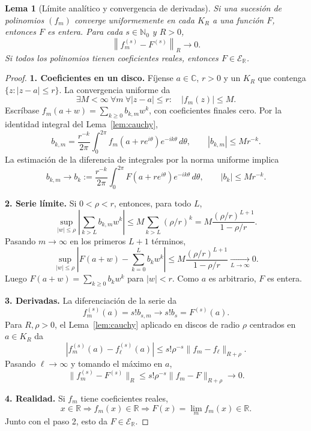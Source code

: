 \documentclass[11pt,a4paper]{article}
\numberwithin{equation}{section}
\newtheorem{lemma}[theorem]{Lema}
\theoremstyle{definition}
\theoremstyle{remark}
\newcommand{\R}{\mathbb R}
\newcommand{\C}{\mathbb C}
\newcommand{\Nn}{\mathbb N_0}
\newcommand{\ER}{\mathcal E_{\R}}
\newcommand{\norm}[1]{\left\lVert#1\right\rVert}
\newcommand{\paso}[1]{\par\smallskip\noindent\textbf{#1}\quad}
\begin{document}
\begin{lemma}[Límite analítico y convergencia de derivadas]\label{lem:analyticlimit}
Si una sucesión de polinomios $(f_m)$ converge uniformemente en cada $K_R$ a una función $F$, entonces $F$ es entera. Para cada $s\in\Nn$ y $R>0$,
\[
\norm{f_m^{(s)}-F^{(s)}}_R\longrightarrow0.
\]
Si todos los polinomios tienen coeficientes reales, entonces $F\in\ER$.
\end{lemma}
\begin{proof}
\paso{1. Coeficientes en un disco.}
Fíjense $a\in\C$, $r>0$ y un $K_R$ que contenga $\{z:|z-a|\le r\}$. La convergencia uniforme da
\[
\exists M<\infty\ \forall m\ \forall |z-a|\le r:\quad |f_m(z)|\le M.
\]
Escríbase $f_m(a+w)=\sum_{k\ge0}b_{k,m}w^k$, con coeficientes finales cero. Por la identidad integral del Lema~\ref{lem:cauchy},
\[
b_{k,m}=\frac{r^{-k}}{2\pi}\int_0^{2\pi}f_m(a+re^{i\theta})e^{-ik\theta}\,d\theta,
\qquad |b_{k,m}|\le Mr^{-k}.
\]
La estimación de la diferencia de integrales por la norma uniforme implica
\[
b_{k,m}\to b_k:=\frac{r^{-k}}{2\pi}\int_0^{2\pi}F(a+re^{i\theta})e^{-ik\theta}\,d\theta,
\qquad |b_k|\le Mr^{-k}.
\]
\paso{2. Serie límite.}
Si $0<\rho<r$, entonces, para todo $L$,
\[
\sup_{|w|\le\rho}\left|\sum_{k>L}b_{k,m}w^k\right|
\le M\sum_{k>L}(\rho/r)^k
=M\frac{(\rho/r)^{L+1}}{1-\rho/r}.
\]
Pasando $m\to\infty$ en los primeros $L+1$ términos,
\[
\sup_{|w|\le\rho}\left|F(a+w)-\sum_{k=0}^Lb_kw^k\right|
\le M\frac{(\rho/r)^{L+1}}{1-\rho/r}\xrightarrow[L\to\infty]{}0.
\]
Luego $F(a+w)=\sum_{k\ge0}b_kw^k$ para $|w|<r$. Como $a$ es arbitrario, $F$ es entera.
\paso{3. Derivadas.}
La diferenciación de la serie da
\[
f_m^{(s)}(a)=s!b_{s,m}\longrightarrow s!b_s=F^{(s)}(a).
\]
Para $R,\rho>0$, el Lema~\ref{lem:cauchy} aplicado en discos de radio $\rho$ centrados en $a\in K_R$ da
\[
|f_m^{(s)}(a)-f_\ell^{(s)}(a)|\le s!\rho^{-s}\|f_m-f_\ell\|_{R+\rho}.
\]
Pasando $\ell\to\infty$ y tomando el máximo en $a$,
\[
\|f_m^{(s)}-F^{(s)}\|_R\le s!\rho^{-s}\|f_m-F\|_{R+\rho}\longrightarrow0.
\]
\paso{4. Realidad.}
Si $f_m$ tiene coeficientes reales,
\[
x\in\R\Longrightarrow f_m(x)\in\R
\Longrightarrow F(x)=\lim_m f_m(x)\in\R.
\]
Junto con el paso 2, esto da $F\in\ER$.
\end{proof}
\end{document}
